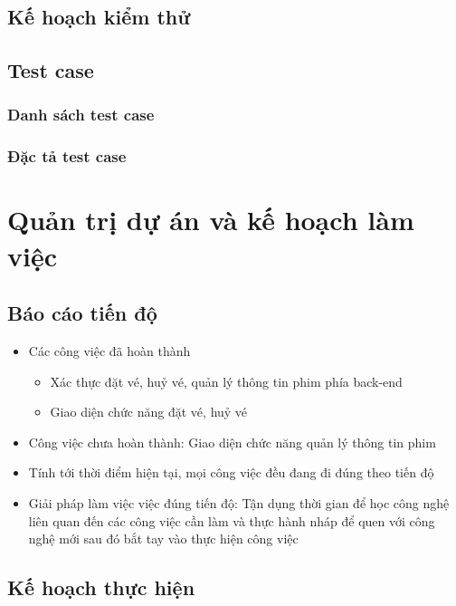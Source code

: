 \documentclass[a4paper, 12pt]{article}
\begin{document}
\subsection{Kế hoạch kiểm thử}

\subsection{Test case}

\subsubsection{Danh sách test case}

\subsubsection{Đặc tả test case}

\clearpage

\section{Quản trị dự án và kế hoạch làm việc}

\subsection{Báo cáo tiến độ}

\begin{itemize}
	\item Các công việc đã hoàn thành
	\begin{itemize}
		\item Xác thực đặt vé, huỷ vé, quản lý thông tin phim phía back-end
		\item Giao diện chức năng đặt vé, huỷ vé
	\end{itemize}
	\item Công việc chưa hoàn thành: Giao diện chức năng quản lý thông tin phim 

	\item Tính tới thời điểm hiện tại, mọi công việc đều đang đi đúng theo tiến độ
	\item Giải pháp làm việc việc đúng tiến độ: Tận dụng thời gian để học công nghệ liên quan đến các công việc cần làm và thực hành nháp để quen với công nghệ mới sau đó bắt tay vào thực hiện công việc
\end{itemize}

\clearpage 

\subsection{Kế hoạch thực hiện}
\end{document}

